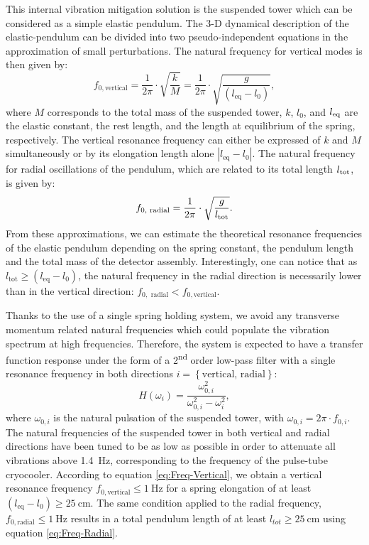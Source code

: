 This internal vibration mitigation solution is the suspended tower which can be considered as a simple elastic pendulum.
The 3-D dynamical description of the elastic-pendulum can be divided into two pseudo-independent equations in the approximation of small perturbations. The natural frequency for vertical modes is then given by:
\begin{equation}
f_{0,\textrm{vertical}}=\frac{1}{2\pi}\cdot\sqrt{\frac{k}{M}} = \frac{1}{2\pi}\cdot\sqrt{\frac{g}{(l_{\textrm{eq}}-l_{0})}}\label{eq:Freq-Vertical},
\end{equation}
where $M$ corresponds to the total mass of the suspended tower, $k$, $l_0$, and $l_{\rm eq}$ are the elastic constant, the rest length, and the length at equilibrium of the spring, respectively. The vertical resonance frequency can either be expressed of $k$ and $M$ simultaneously or by its elongation length alone $|l_{\textrm{eq}}-l_{0}|$. The natural frequency for radial oscillations of the pendulum, which are related to its total length  $l_{\rm tot}$, is given by:
\begin{equation}
f_{0,\textrm{ radial}}=\frac{1}{2\pi}\cdot\sqrt{\frac{g}{l_{\rm tot}}}\label{eq:Freq-Radial}.
\end{equation}
From these approximations, we can estimate the theoretical resonance frequencies of the elastic pendulum depending on the spring constant, the pendulum length and the total mass of the detector assembly. Interestingly, one can notice that as $l_{\textrm{tot}} \geq (l_{\textrm{eq}}-l_{0})$, the natural frequency in the radial direction is necessarily lower than in the vertical direction: $f_{0,\textrm{ radial}}<f_{0,\textrm{vertical}}$. 

Thanks to the use of a single spring holding system, we avoid any transverse momentum related natural frequencies which could populate the vibration spectrum at high frequencies. Therefore, the system is expected to have a transfer function response under the form of a 2\textsuperscript{nd} order low-pass filter with a single resonance frequency in both directions $i=\left\{ \textrm{vertical, radial}\right\}$:
\begin{equation}
H(\omega_{i})=\frac{\omega_{0,i}^{2}}{\omega_{0,i}^{2}-\omega_{i}^{2}}\label{eq:Transfer-function},
\end{equation}
where $\omega_{0,i}$ is the natural pulsation of the suspended tower, with $\omega_{0,i}=2\pi\cdot f_{0,i}$. 
The natural frequencies of the suspended tower in both vertical and radial directions have been tuned to be as low as possible in order to attenuate all vibrations above \SI{1.4}{\Hz}, corresponding to the frequency of the pulse-tube cryocooler. According to equation \ref{eq:Freq-Vertical}, we obtain a vertical resonance frequency $f_{0,\textrm{vertical}} \leq \SI{1}{\Hz}$ for a spring elongation of at least $(l_{\textrm{eq}}-l_{0})\geq \SI{25}{\cm}$. The same condition applied to the radial frequency, $f_{0,\textrm{radial}} \leq \SI{1}{\Hz}$ results in a total pendulum length of at least  $l_{tot}\geq \SI{25}{\cm}$ using equation \ref{eq:Freq-Radial}.

